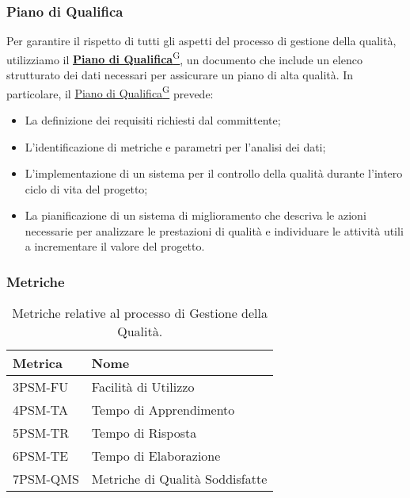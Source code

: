 \subsubsection{Piano di Qualifica}
Per garantire il rispetto di tutti gli aspetti del processo di gestione della qualità, utilizziamo il 
\href{https://code7crusaders.github.io/docs/RTB/documentazione_interna/glossario.html#piano-di-qualifica}{\textbf{Piano di Qualifica}\textsuperscript{G}}, un documento che include un elenco strutturato dei dati necessari per assicurare un piano di alta qualità. In particolare, il \href{https://code7crusaders.github.io/docs/RTB/documentazione_interna/glossario.html#piano-di-qualifica}{Piano di Qualifica\textsuperscript{G}} prevede:  
\begin{itemize}
    \item La definizione dei requisiti richiesti dal committente;
    \item L’identificazione di metriche e parametri per l’analisi dei dati;
    \item L’implementazione di un sistema per il controllo della qualità durante l’intero ciclo di vita del progetto;
    \item La pianificazione di un sistema di miglioramento che descriva le azioni necessarie per analizzare le prestazioni di qualità e individuare le attività utili a incrementare il valore del progetto.
\end{itemize}


\subsubsection{Metriche}
\begin{table}[h!]
    \centering
    \renewcommand{\arraystretch}{1.5}
    \begin{tabular}{|l|l|}
        \hline
        \textbf{Metrica} & \textbf{Nome} \\
        \hline
        3PSM-FU & Facilità di Utilizzo \\
        \hline
        4PSM-TA & Tempo di Apprendimento \\
        \hline
        5PSM-TR & Tempo di Risposta \\
        \hline
        6PSM-TE & Tempo di Elaborazione\\
        \hline
        7PSM-QMS & Metriche di Qualità Soddisfatte \\
        \hline
    \end{tabular}
    \caption{Metriche relative al processo di Gestione della Qualità.}
\end{table}











